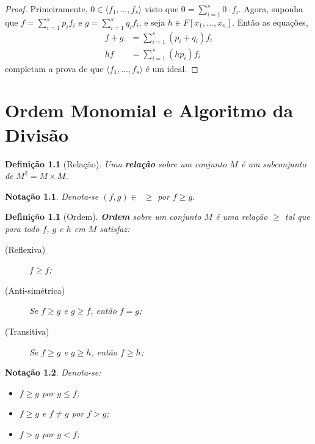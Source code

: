 \documentclass[12pt,a4paper]{report}
\newtheorem{definition}[theorem]{Definição}
\newtheorem*{notation}{Notação}
\numberwithin{theorem}{chapter}
\begin{document}
\begin{proof}
  Primeiramente, \(0 \in \langle f_1,\ldots,f_s \rangle\) visto que
  \(0 = \sum\limits_{i=1}^s{0 \cdot f_i}\).  Agora, suponha que \(f =
  \sum\limits_{i=1}^s{p_if_i}\) e \(g = \sum\limits_{i=1}^sq_if_i\), e seja
  \(h \in F[x_1,\ldots,x_n]\).  Então as equações,
  \begin{align*}
    f + g &= \sum_{i=1}^s (p_i + q_i)f_i\\
    hf &= \sum_{i=1}^s(hp_i)f_i
  \end{align*}
  completam a prova de que \(\langle f_1,\ldots,f_s \rangle\) é um
  ideal.
\end{proof}


\chapter{Ordem Monomial e Algoritmo da Divisão}

\begin{definition}[Relação]
  Uma \textbf{relação} sobre um conjunto \(M\) é um subconjunto de
  \(M^2 = M \times M\).
\end{definition}

\begin{notation}
  Denota-se \((f,g) \in \enspace\geq\) por \(f \geq g\).
\end{notation}

\begin{definition}[Ordem]
  \textbf{Ordem} sobre um conjunto \(M\) é uma relação \(\geq\) tal
  que para todo \(f\), \(g\) e \(h\) em \(M\) satisfaz:
  \begin{description}
  \item[(Reflexiva)] \(f \geq f\);
  \item[(Anti-simétrica)] Se \(f \geq g\) e \(g \geq f\), então \(f = g\);
  \item[(Transitiva)] Se \(f \geq g\) e \(g \geq h\), então \(f \geq h\);
  \end{description}
\end{definition}

\begin{notation}
  Denota-se:
  \begin{itemize}
  \item \(f \geq g\) por \(g \leq f\);
  \item \(f \geq g\) e \(f \neq g\) por \(f > g\);
  \item \(f > g\) por \(g < f\);
  \end{itemize}
\end{notation}
\end{document}

